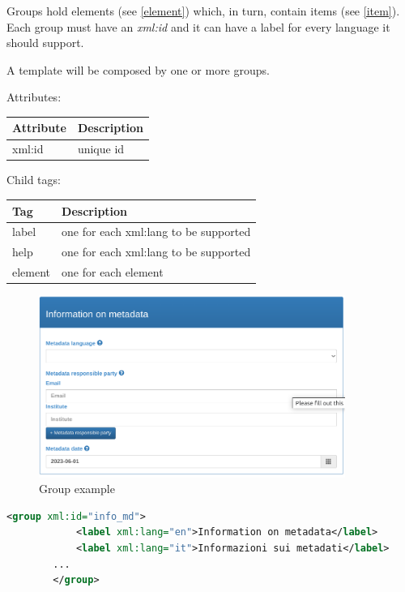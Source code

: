 \documentclass[10pt]{article}
\begin{document}
	Groups hold elements (see \ref{element}) which, in turn, contain items (see \ref{item}).
	Each group must have an \textit{xml:id} and it can have a label for every language it should support.
	
	A template will be composed by one or more groups.
	
	Attributes:
	\begin{center}
		\begin{tabular}{ | p{} | p{} | }
			\hline
			Attribute & Description \\ 
			\hline
			xml:id & unique id \\
			\hline
		\end{tabular}
	\end{center}
	
	Child tags:
	\begin{center}
		\begin{tabular}{ | p{} | p{} | }
			\hline
			Tag & Description \\ 
			\hline
			label & one for each xml:lang to be supported \\
			help & one for each xml:lang to be supported \\
			\hline
			element & one for each element \\
			\hline
			
		\end{tabular}
	\end{center}
	
	\begin{figure}[h]
		\caption{Group example}
		\includegraphics[width=10cm]{Group example.png}
		\centering
	\end{figure}
	
	\begin{lstlisting}[language=xml]
		<group xml:id="info_md">
			<label xml:lang="en">Information on metadata</label>
			<label xml:lang="it">Informazioni sui metadati</label>
		...
		</group>
	\end{lstlisting}
	
\end{document}
